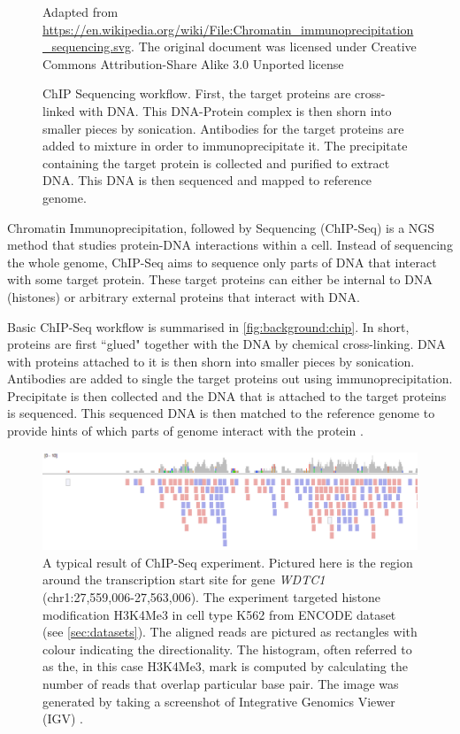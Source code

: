 \documentclass[parskip]{cs4rep}
\newcommand{\histonemodification}[1]{#1}
\newcommand{\celltype}[1]{#1}
\begin{document}
\begin{figure}
{Adapted from \url{https://en.wikipedia.org/wiki/File:Chromatin_immunoprecipitation_sequencing.svg}.
The original document was licensed under Creative Commons Attribution-Share Alike 3.0 Unported license}
\caption{ChIP Sequencing workflow. First, the target proteins are cross-linked with DNA. This DNA-Protein complex is then shorn into smaller pieces by sonication. Antibodies for the target proteins are added to mixture in order to immunoprecipitate it. The precipitate containing the target protein is collected and purified to extract DNA. This DNA is then sequenced and mapped to reference genome.
}
\label{fig:background:chip}
\end{figure}

Chromatin Immunoprecipitation, followed by Sequencing (ChIP-Seq) is a NGS method that studies protein-DNA interactions within a cell. Instead of sequencing the whole genome, ChIP-Seq aims to sequence only parts of DNA that interact with some target protein. These target proteins can either be internal to DNA (histones) or arbitrary external proteins that interact with DNA.

Basic ChIP-Seq workflow is summarised in \autoref{fig:background:chip}. In short, proteins are first ``glued" together with the DNA by chemical cross-linking. DNA with proteins attached to it is then shorn into smaller pieces by sonication. Antibodies are added to single the target proteins out using immunoprecipitation. Precipitate is then collected and the DNA that is attached to the target proteins is sequenced. This sequenced DNA is then matched to the reference genome to provide hints of which parts of genome interact with the protein \cite{Mardis:2007wa}.

\begin{figure}[t]
    \centering
    \includegraphics[width=\textwidth]{figures/background/igv_panel_screenshot_k562_h3k4me3_WDTC1-transparentbcg.png}
    \caption{A typical result of ChIP-Seq experiment. Pictured here is the region around the transcription start site for gene \emph{WDTC1} (chr1:27,559,006-27,563,006). The experiment targeted histone modification \histonemodification{H3K4Me3} in cell type \celltype{K562} from ENCODE dataset (see \autoref{sec:datasets}). The aligned reads are pictured as rectangles with colour indicating the directionality. The histogram, often referred to as the, in this case \histonemodification{H3K4Me3}, mark is computed by calculating the number of reads that overlap particular base pair. The image was generated by taking a screenshot of Integrative Genomics Viewer (IGV) \cite{Thorvaldsdottir:2012wy}.}
    \label{fig:background:chip-results}
\end{figure}
\end{document}
